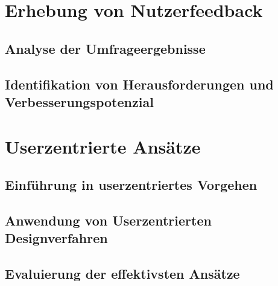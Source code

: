 \section{Erhebung von Nutzerfeedback}

\subsection{Analyse der Umfrageergebnisse}

\subsection{Identifikation von Herausforderungen und Verbesserungspotenzial}

\section{Userzentrierte Ansätze}

\subsection{Einführung in userzentriertes Vorgehen}

\subsection{Anwendung von Userzentrierten Designverfahren}

\subsection{Evaluierung der effektivsten Ansätze}

